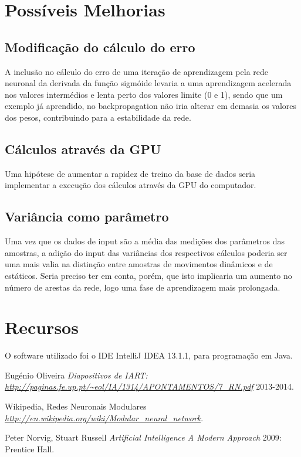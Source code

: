 \documentclass[10pt,a4paper]{article}
\begin{document}
\section{Possíveis Melhorias}
\subsection{Modificação do cálculo do erro}
A inclusão no cálculo do erro de uma iteração de aprendizagem pela rede neuronal da derivada da função sigmóide levaria a uma aprendizagem acelerada nos valores intermédios e lenta perto dos valores limite (0 e 1), sendo que um exemplo já aprendido, no backpropagation não iria alterar em demasia os valores dos pesos, contribuindo para a estabilidade da rede. 

\subsection{Cálculos através da GPU}
Uma hipótese de aumentar a rapidez de treino da base de dados seria implementar a execução dos cálculos através da GPU do computador.

\subsection{Variância como parâmetro}
Uma vez que os dados de input são a média das medições dos parâmetros das amostras, a adição do input das variâncias dos respectivos cálculos poderia ser uma mais valia na distinção entre amostras de movimentos dinâmicos e de estáticos. Seria preciso ter em conta, porém, que isto implicaria um aumento no número de arestas da rede, logo uma fase de aprendizagem mais prolongada.

\section{Recursos}

O software utilizado foi o IDE IntelliJ IDEA 13.1.1, para programação em Java.


 \begin{thebibliography}{1}

   Eugénio Oliveira {\em Diapositivos de IART: {\url{http://paginas.fe.up.pt/~eol/IA/1314/APONTAMENTOS/7_RN.pdf}}}  2013-2014.
  
   Wikipedia, Redes Neuronais Modulares {\em\url{http://en.wikipedia.org/wiki/Modular_neural_network}}.

   Peter Norvig, Stuart Russell {\em Artificial Intelligence A Modern Approach } 2009: Prentice Hall.
  \end{thebibliography}
  \printindex
\end{document}
